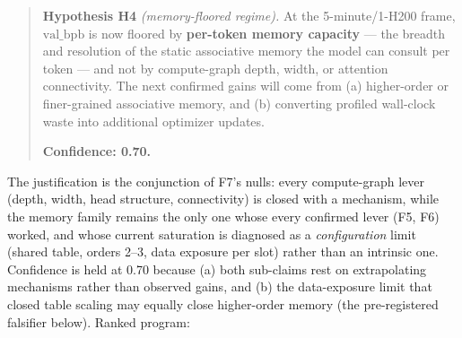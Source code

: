 \documentclass{article}
\newcommand{\valbpb}{\mathrm{val\_bpb}}
\begin{document}
\begin{quote}
\textbf{Hypothesis H4} \emph{(memory-floored regime).} At the 5-minute/1-H200 frame, $\valbpb$ is now floored by \textbf{per-token memory capacity} --- the breadth and resolution of the static associative memory the model can consult per token --- and not by compute-graph depth, width, or attention connectivity. The next confirmed gains will come from (a) higher-order or finer-grained associative memory, and (b) converting profiled wall-clock waste into additional optimizer updates.

\textbf{Confidence: 0.70.}
\end{quote}

The justification is the conjunction of F7's nulls: every compute-graph lever (depth, width, head structure, connectivity) is closed with a mechanism, while the memory family remains the only one whose every confirmed lever (F5, F6) worked, and whose current saturation is diagnosed as a \emph{configuration} limit (shared table, orders 2--3, data exposure per slot) rather than an intrinsic one. Confidence is held at 0.70 because (a) both sub-claims rest on extrapolating mechanisms rather than observed gains, and (b) the data-exposure limit that closed table scaling may equally close higher-order memory (the pre-registered falsifier below). Ranked program:
\end{document}
